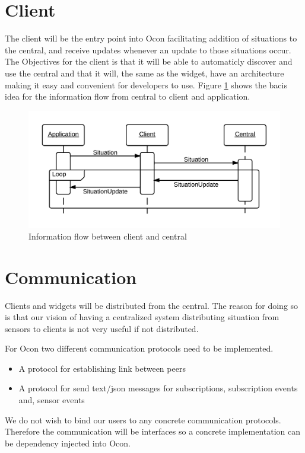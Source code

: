 \documentclass[../report.tex]{subfiles}
\begin{document}
\section{Client}

The client will be the entry point into Ocon facilitating addition of situations to the central, and receive updates whenever an update to those situations occur. The Objectives for the client is that it will be able to automaticly discover and use the central and that it will, the same as the widget, have an architecture making it easy and convenient for developers to use. Figure \ref{seqclient} shows the bacis idea for the information flow from central to client and application.


\begin{figure}[h]
\centering
\includegraphics[scale=0.2]{clientsequencediagram.png}
\caption{Information flow between client and central}
\label{seqclient}
\end{figure}


\section{Communication}

Clients and widgets will be distributed from the central. The reason for doing so is that our vision of having a centralized system distributing situation from sensors to clients is not very useful if not distributed.

For Ocon two different communication protocols need to be implemented.\\

\begin{itemize}
    \item A protocol for establishing link between peers
    \item A protocol for send text/json messages for subscriptions, subscription events and, sensor events \\
\end{itemize}

We do not wish to bind our users to any concrete communication protocols. Therefore the communication will be interfaces so a concrete implementation can be dependency injected into Ocon.
\end{document}
